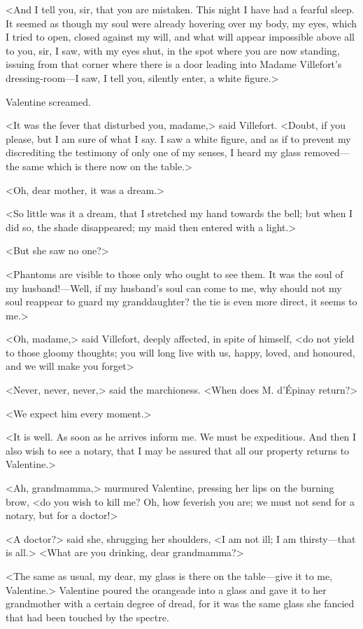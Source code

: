  <And I tell you, sir, that you are mistaken. This night I have had a fearful sleep. It seemed as though my soul were already hovering over my body, my eyes, which I tried to open, closed against my will, and what will appear impossible above all to you, sir, I saw, with my eyes shut, in the spot where you are now standing, issuing from that corner where there is a door leading into Madame Villefort's dressing-room—I saw, I tell you, silently enter, a white figure.> 

 Valentine screamed. 

 <It was the fever that disturbed you, madame,> said Villefort.  <Doubt, if you please, but I am sure of what I say. I saw a white figure, and as if to prevent my discrediting the testimony of only one of my senses, I heard my glass removed—the same which is there now on the table.> 

 <Oh, dear mother, it was a dream.> 

 <So little was it a dream, that I stretched my hand towards the bell; but when I did so, the shade disappeared; my maid then entered with a light.> 

 <But she saw no one?> 

 <Phantoms are visible to those only who ought to see them. It was the soul of my husband!—Well, if my husband's soul can come to me, why should not my soul reappear to guard my granddaughter? the tie is even more direct, it seems to me.> 

 <Oh, madame,> said Villefort, deeply affected, in spite of himself, <do not yield to those gloomy thoughts; you will long live with us, happy, loved, and honoured, and we will make you forget\longdash> 

 <Never, never, never,> said the marchioness. <When does M. d'Épinay return?> 

 <We expect him every moment.> 

 <It is well. As soon as he arrives inform me. We must be expeditious. And then I also wish to see a notary, that I may be assured that all our property returns to Valentine.> 

 <Ah, grandmamma,> murmured Valentine, pressing her lips on the burning brow, <do you wish to kill me? Oh, how feverish you are; we must not send for a notary, but for a doctor!> 

 <A doctor?> said she, shrugging her shoulders, <I am not ill; I am thirsty—that is all.>  <What are you drinking, dear grandmamma?> 

 <The same as usual, my dear, my glass is there on the table—give it to me, Valentine.> Valentine poured the orangeade into a glass and gave it to her grandmother with a certain degree of dread, for it was the same glass she fancied that had been touched by the spectre. 

